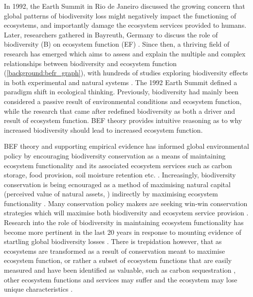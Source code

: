 \begin{refsection}
In 1992, the Earth Summit in Rio de Janeiro discussed the growing concern that global patterns of biodiversity loss might negatively impact the functioning of ecosystems, and importantly damage the ecosystem services provided to humans. Later, researchers gathered in Bayreuth, Germany to discuss the role of biodiversity (B) on ecosystem function (EF) \citep{Schulze1993}. Since then, a thriving field of research has emerged which aims to assess and explain the multiple and complex relationships between biodiversity and ecosystem function (\autoref{background:befr_graph}), with hundreds of studies exploring biodiversity effects in both experimental and natural systems \citep{Plas2019, Newbold2016, Tilman2014}. The 1992 Earth Summit defined a paradigm shift in ecological thinking. Previously, biodiversity had mainly been considered a passive result of environmental conditions and ecosystem function, while the research that came after redefined biodiversity as both a driver and result of ecosystem function. BEF theory provides intuitive reasoning as to why increased biodiversity should lead to increased ecosystem function. 

BEF theory and supporting empirical evidence has informed global environmental policy by encouraging biodiversity conservation as a means of maintaining ecosystem functionality and its associated ecosystem services such as carbon storage, food provision, soil moisture retention etc. \citep{Balvanera2014, Naeem2012}. Increasingly, biodiversity conservation is being ecnouraged as a method of maximising natural capital (perceived value of natural assets, \citealt{Kareiva2011}) indirectly by maximising ecosystem functionality \citep{Scherer-Lorenzen2014, Cardinale2012}. Many conservation policy makers are seeking win-win conservation strategies which will maximise both biodiversity and ecosystem service provision \citep{Howe2014, Adams2004}. Research into the role of biodiversity in maintaining ecosystem functionality has become more pertinent in the last 20 years in response to mounting evidence of startling global biodiversity losses \citep{McRae2017, Butchart2010, Vitousek1997}. There is trepidation however, that as ecosystems are transformed as a result of conservation meant to maximise ecosystem function, or rather a subset of ecosystem functions that are easily measured and have been identified as valuable, such as carbon sequestration \citep{Duffy2017}, other ecosystem functions and services may suffer and the ecosystem may lose unique characteristics \citep{Brockerhoff2017, Srivastava2005a}. 


\end{refsection}
